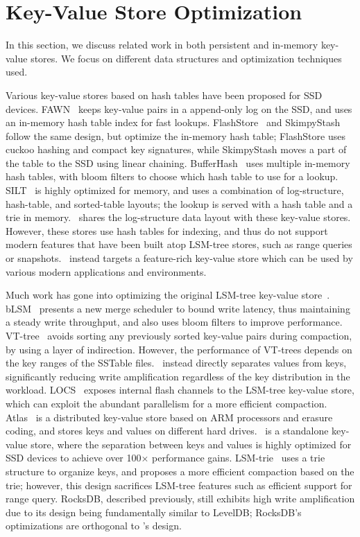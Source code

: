 \section{Key-Value Store Optimization}

In this section, we discuss related work in both persistent and
in-memory key-value stores. We focus on different data structures and
optimization techniques used. 

Various key-value stores based on hash tables have been proposed for SSD devices.
FAWN~\cite{Anderson+09-Fawn} keeps key-value pairs in a append-only log on the
SSD, and uses an in-memory hash table index for fast lookups. 
FlashStore~\cite{DebnathEtAl10-VLDB} and
SkimpyStash~\cite{DebnathEtAl11-SIGMOD} follow the same design, but optimize
the in-memory hash table; FlashStore uses cuckoo hashing and compact key
signatures, while SkimpyStash moves a part of the table to the SSD
using linear chaining. BufferHash~\cite{AnandEtAl10-NSDI} uses multiple
in-memory hash tables, with bloom filters to choose which hash table to use for
a lookup. SILT~\cite{LimEtAl11-SOSP} is highly optimized for memory, and uses a
combination of log-structure, hash-table, and sorted-table layouts; the lookup
is served with a hash table and a trie in memory.
\toolname\ shares the
log-structure data layout with these key-value stores. However, these stores
use hash tables for indexing, and thus do not support modern features that have
been built atop LSM-tree stores, such as range queries or snapshots. \toolname\
instead targets a feature-rich key-value store which can be used by various
modern applications and environments. 

Much work has gone into optimizing the original LSM-tree key-value
store~\cite{ONeil96-LSMTree}.  bLSM~\cite{SearsEtAl12-SIGMOD} presents a new
merge scheduler to bound write latency, thus maintaining a steady write
throughput, and also uses bloom filters to improve performance.
VT-tree~\cite{ShettyEtAl13-FAST} avoids sorting any previously sorted key-value
pairs during compaction, by using a layer of indirection. 
However, the performance of VT-trees depends on the key ranges of the SSTable
files. 
\toolname\ instead directly separates values from keys, significantly reducing
write amplification regardless of the key distribution in the workload.
LOCS~\cite{WangEtAl14-Eurosys} exposes internal flash channels to the LSM-tree
key-value store, which can exploit the abundant parallelism for a more
efficient compaction. Atlas~\cite{LaiEtAl15-MSST} is a distributed key-value
store based on ARM processors and erasure coding, and stores keys and values on
different hard drives. \toolname\ is a standalone key-value store, where the
separation between keys and values is highly optimized for SSD devices to
achieve over 100$\times$ performance gains.  LSM-trie~\cite{WuEtAl15-USENIX} uses a
trie structure to organize keys, and proposes a more efficient compaction based
on the trie; however, this design sacrifices LSM-tree features such as
efficient support for range query.  RocksDB, described previously, still
exhibits high write amplification due to its design being fundamentally similar
to LevelDB; RocksDB's optimizations are orthogonal to \toolname's
design.

